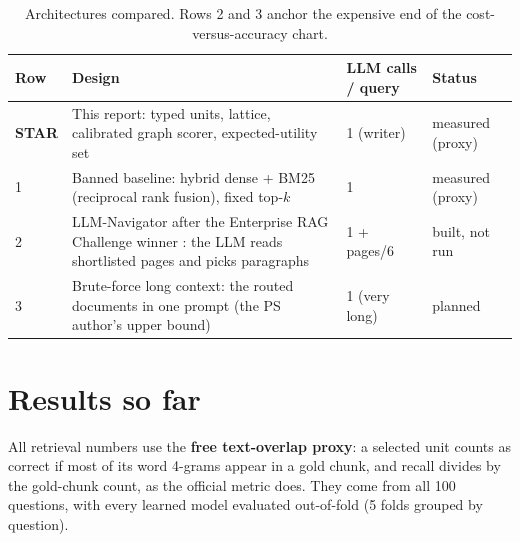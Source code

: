 \documentclass[10pt,a4paper]{article}
\newcommand{\STAR}{\textsc{STAR}}
\begin{document}
\begin{table}[h]
\centering\small
\begin{tabularx}{\linewidth}{@{}lXll@{}}
\toprule
\textbf{Row} & \textbf{Design} & \textbf{LLM calls / query} & \textbf{Status} \\
\midrule
\textbf{\STAR} & This report: typed units, lattice, calibrated graph scorer, expected-utility set & 1 (writer) & measured (proxy) \\
1 & Banned baseline: hybrid dense + BM25 (reciprocal rank fusion), fixed top-$k$ & 1 & measured (proxy) \\
2 & LLM-Navigator after the Enterprise RAG Challenge winner \cite{ricerag}: the LLM reads shortlisted pages and picks paragraphs & 1 + pages/6 & built, not run \\
3 & Brute-force long context: the routed documents in one prompt (the PS author's upper bound) & 1 (very long) & planned \\
\bottomrule
\end{tabularx}
\caption{Architectures compared. Rows 2 and 3 anchor the expensive end of the cost-versus-accuracy chart.}
\end{table}

\section{Results so far}

All retrieval numbers use the \textbf{free text-overlap proxy}: a selected unit counts as correct if most of its word 4-grams appear in a gold chunk, and recall divides by the gold-chunk count, as the official metric does.
They come from all 100 questions, with every learned model evaluated out-of-fold (5 folds grouped by question).
\end{document}
